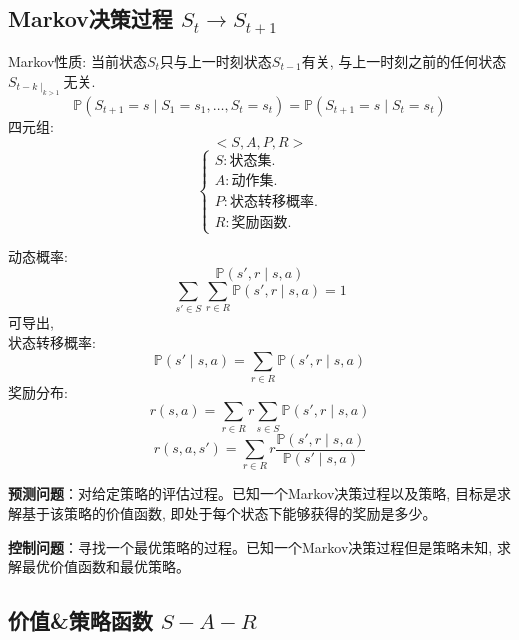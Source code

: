 \documentclass{article}
\begin{document}
    \subsection{Markov决策过程 $S_t \to S_{t+1}$}
        Markov性质: 当前状态$S_t$只与上一时刻状态$S_{t-1}$有关, 与上一时刻之前的任何状态$S_{t-k \mid_{k > 1}}$无关.
            $$\mathbb{P}\left(S_{t+1}=s \mid S_{1}=s_{1}, \ldots, S_{t}=s_{t}\right)=\mathbb{P}\left(S_{t+1}=s \mid S_{t}=s_{t}\right)$$
        四元组:
            $$<S, A, P, R>$$
            \begin{displaymath} \left\{ \begin{array}{l}
                S: \text{状态集.}\\
                A: \text{动作集.}\\
                P: \text{状态转移概率.}\\
                R: \text{奖励函数}.
            \end{array} \right. \end{displaymath}
            
        动态概率:
            $$\mathbb{P}(s', r \mid s, a)$$
            $$\sum_{s' \in S} \sum_{r \in R} \mathbb{P}(s', r \mid s, a) = 1$$
        可导出,\\
        状态转移概率:
            $$\mathbb{P}(s' \mid s,a) = \sum_{r \in R} \mathbb{P}(s', r \mid s, a)$$
        奖励分布:
            $$r(s, a) = \sum_{r \in R} r \sum_{s \in S} \mathbb{P}(s', r \mid s, a)$$
            $$r(s, a, s') = \sum_{r \in R} r \frac{\mathbb{P}(s', r \mid s, a)}{\mathbb{P}(s' \mid s, a)}$$
            
        \textbf{预测问题}：对给定策略的评估过程。已知一个Markov决策过程以及策略, 目标是求解基于该策略的价值函数, 即处于每个状态下能够获得的奖励是多少。
        
        \textbf{控制问题}：寻找一个最优策略的过程。已知一个Markov决策过程但是策略未知, 求解最优价值函数和最优策略。

        
    \subsection{价值\&策略函数 $S-A-R$}
\end{document}
